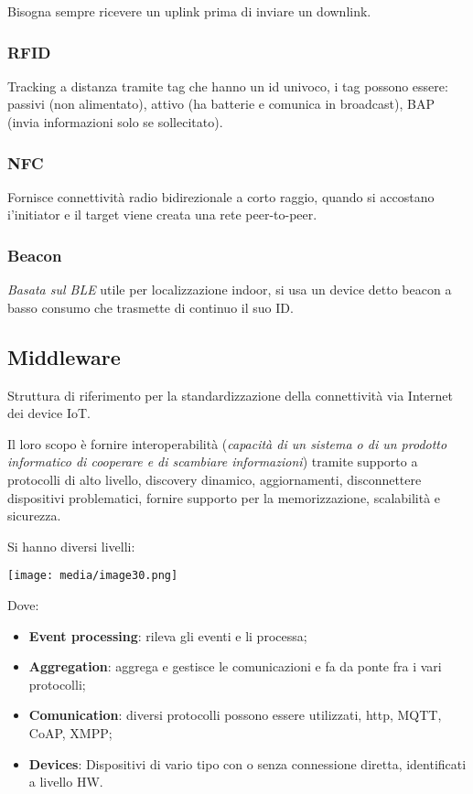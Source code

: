 Bisogna sempre ricevere un uplink prima di inviare un downlink.

\subsubsection{RFID}\label{rfid}

Tracking a distanza tramite tag che hanno un id univoco, i tag possono
essere: passivi (non alimentato), attivo (ha batterie e comunica in
broadcast), BAP (invia informazioni solo se sollecitato).

\subsubsection{NFC}\label{nfc}

Fornisce connettività radio bidirezionale a corto raggio, quando si
accostano i'initiator e il target viene creata una rete peer-to-peer.

\subsubsection{Beacon}\label{beacon}

\emph{Basata sul BLE} utile per localizzazione indoor, si usa un device
detto beacon a basso consumo che trasmette di continuo il suo ID.

\subsection{Middleware}\label{middleware}

Struttura di riferimento per la standardizzazione della connettività via
Internet dei device IoT.

Il loro scopo è fornire interoperabilità (\emph{capacità di un sistema o
di un prodotto informatico di cooperare e di scambiare informazioni})
tramite supporto a protocolli di alto livello, discovery dinamico,
aggiornamenti, disconnettere dispositivi problematici, fornire supporto
per la memorizzazione, scalabilità e sicurezza.

Si hanno diversi livelli:

\texttt{[image: media/image30.png]}

Dove:

\begin{itemize}
\item
  \textbf{Event processing}: rileva gli eventi e li processa;
\item
  \textbf{Aggregation}: aggrega e gestisce le comunicazioni e fa da
  ponte fra i vari protocolli;
\item
  \textbf{Comunication}: diversi protocolli possono essere utilizzati,
  http, MQTT, CoAP, XMPP;
\item
  \textbf{Devices}: Dispositivi di vario tipo con o senza connessione
  diretta, identificati a livello HW.
\end{itemize}

